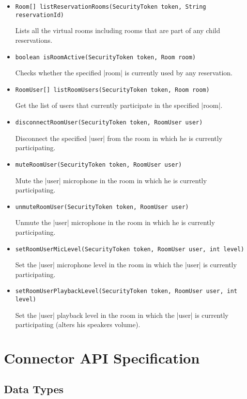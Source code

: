 \documentclass[a4paper]{report}
\newenvironment{Api}{\begin{itemize}}{\end{itemize}}
\newcommand{\ApiCode}[1]{\lstinline[style=styleApi]|#1|}
\newcommand{\ApiItem}[1]{\item #1 %

}
\newcommand{\ApiCmd}[1]{\ApiItem{\ApiCode{#1}}}
\newcommand{\ApiClass}[2]{\ApiItem{%
  \ifx&#2& \ApiCode{class #1} \else \ApiCode{class #1 extends #2} \fi}%
}
\newenvironment{ApiClassAttributes}{%

\begin{samepage}\textbf{Attributes:}\begin{compactitem}}{\end{compactitem}\end{samepage}}
\newcommand{\ApiRequired}{{\color{blue!50!black}\textbf{Required}}}
\newcommand{\ApiReadOnly}{{\color{red!50!black}\textbf{ReadOnly}}}
\newcommand{\ApiClassAttribute}[3]{\ApiItem{\ApiCode{#2} \ApiCode{#1} \hspace{1mm}(\ifx&#3&\ApiReadOnly\else#3\fi)
}}
\begin{document}
\begin{Api}

\ApiCmd{Room[] listReservationRooms(SecurityToken token, String reservationId)}
Lists all the virtual rooms including rooms that are part of any child reservations.

\ApiCmd{boolean isRoomActive(SecurityToken token, Room room)}
Checks whether the specified |room| is currently used by any reservation.

\ApiCmd{RoomUser[] listRoomUsers(SecurityToken token, Room room)}
Get the list of users that currently participate in the specified |room|.

\ApiCmd{disconnectRoomUser(SecurityToken token, RoomUser user)}
Disconnect the specified |user| from the room in which he is currently participating.

\ApiCmd{muteRoomUser(SecurityToken token, RoomUser user)}
Mute the |user| microphone in the room in which he is currently participating.

\ApiCmd{unmuteRoomUser(SecurityToken token, RoomUser user)}
Unmute the |user| microphone in the room in which he is currently participating.

\ApiCmd{setRoomUserMicLevel(SecurityToken token, RoomUser user, int level)}
Set the |user| microphone level in the room in which the |user| is currently participating.

\ApiCmd{setRoomUserPlaybackLevel(SecurityToken token, RoomUser user, int level)}
Set the |user| playback level in the room in which the |user| is currently participating (alters his speakers volume).

\end{Api}


\chapter{Connector API Specification}

\section{Data Types}


\end{document}
